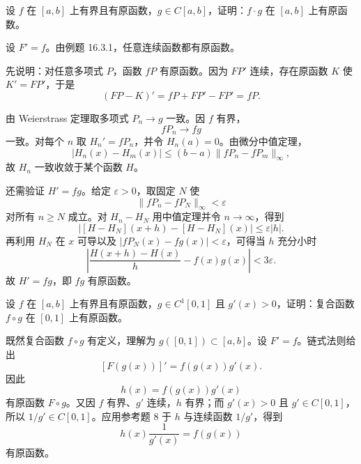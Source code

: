 \begin{xreferenceproblem}[8]
设 $f$ 在 $[a,b]$ 上有界且有原函数，$g\in C[a,b]$，证明：$f\cdot g$ 在 $[a,b]$ 上有原函数。
\end{xreferenceproblem}
\begin{xsolution}
设 $F'=f$。由例题 16.3.1，任意连续函数都有原函数。

先说明：对任意多项式 $P$，函数 $fP$ 有原函数。因为 $FP'$ 连续，存在原函数 $K$ 使 $K'=FP'$，于是
\[
  (FP-K)'=fP+FP'-FP'=fP.
\]

由 Weierstrass 定理取多项式 $P_n\to g$ 一致。因 $f$ 有界，
\[
  fP_n\to fg
\]
一致。对每个 $n$ 取 $H_n'=fP_n$，并令 $H_n(a)=0$。由微分中值定理，
\[
  |H_n(x)-H_m(x)|\leqslant(b-a)\|fP_n-fP_m\|_\infty,
\]
故 $H_n$ 一致收敛于某个函数 $H$。

还需验证 $H'=fg$。给定 $\varepsilon>0$，取固定 $N$ 使
\[
  \|fP_n-fP_N\|_\infty<\varepsilon
\]
对所有 $n\geqslant N$ 成立。对 $H_n-H_N$ 用中值定理并令 $n\to\infty$，得到
\[
  |[H-H_N](x+h)-[H-H_N](x)|\leqslant\varepsilon|h|.
\]
再利用 $H_N$ 在 $x$ 可导以及 $|fP_N(x)-fg(x)|<\varepsilon$，可得当 $h$ 充分小时
\[
  \left|\frac{H(x+h)-H(x)}h-f(x)g(x)\right|<3\varepsilon.
\]
故 $H'=fg$，即 $fg$ 有原函数。
\end{xsolution}


\begin{xreferenceproblem}[9]
设 $f$ 在 $[a,b]$ 上有界且有原函数，$g\in C^1[0,1]$ 且 $g'(x)>0$，证明：复合函数 $f\circ g$ 在 $[0,1]$ 上有原函数。
\end{xreferenceproblem}
\begin{xsolution}
既然复合函数 $f\circ g$ 有定义，理解为 $g([0,1])\subset[a,b]$。设 $F'=f$。链式法则给出
\[
  [F(g(x))]'=f(g(x))g'(x).
\]
因此
\[
  h(x)=f(g(x))g'(x)
\]
有原函数 $F\circ g$。又因 $f$ 有界、$g'$ 连续，$h$ 有界；而 $g'(x)>0$ 且 $g'\in C[0,1]$，所以 $1/g'\in C[0,1]$。应用参考题 8 于 $h$ 与连续函数 $1/g'$，得到
\[
  h(x)\frac1{g'(x)}=f(g(x))
\]
有原函数。
\end{xsolution}


